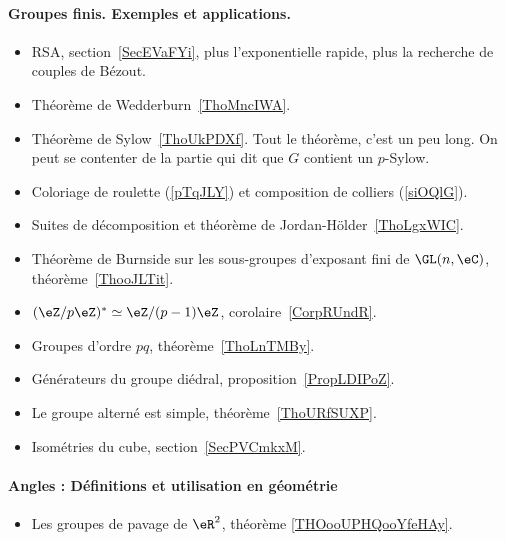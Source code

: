 \paragraph{Groupes finis. Exemples et applications.}
\begin{itemize}
    \item RSA, section~\ref{SecEVaFYi}, plus l'exponentielle rapide, plus la recherche de couples de Bézout.
    \item Théorème de Wedderburn~\ref{ThoMncIWA}.
    \item Théorème de Sylow~\ref{ThoUkPDXf}. Tout le théorème, c'est un peu long. On peut se contenter de la partie qui dit que \( G\) contient un \( p\)-Sylow.
    \item Coloriage de roulette (\ref{pTqJLY}) et composition de colliers (\ref{siOQlG}).
    \item Suites de décomposition et théorème de Jordan-Hölder~\ref{ThoLgxWIC}.
    \item Théorème de Burnside sur les sous-groupes d'exposant fini de \( \GL(n,\eC)\), théorème~\ref{ThooJLTit}.
    \item \( (\eZ/p\eZ)^*\simeq \eZ/(p-1)\eZ\), corolaire~\ref{CorpRUndR}.
    \item Groupes d'ordre \( pq\), théorème~\ref{ThoLnTMBy}.
    \item Générateurs du groupe diédral, proposition~\ref{PropLDIPoZ}.
    \item Le groupe alterné est simple, théorème~\ref{ThoURfSUXP}.
    \item Isométries du cube, section~\ref{SecPVCmkxM}.
\end{itemize}
\paragraph{Angles : Définitions et utilisation en géométrie}
\begin{itemize}
    \item Les groupes de pavage de \( \eR^2\), théorème \ref{THOooUPHQooYfeHAy}.
\end{itemize}
